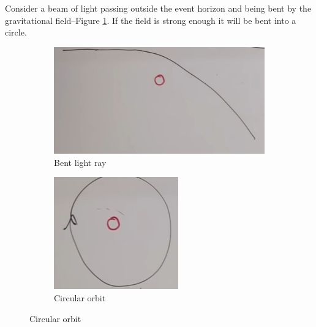 \documentclass[]{article}
\begin{document}
{Consider a beam of light passing outside the event horizon and being bent by the gravitational field--Figure \ref{fig:gr-6-bent-light-ray}. If the field is strong enough it will be bent into a circle.
\begin{figure}[H]
	\caption{Light ray being bent my massive object}
	\begin{subfigure}[t]{0.45\textwidth}
		\caption{Bent light ray}\label{fig:gr-6-bent-light-ray}
		\includegraphics[width=\textwidth]{gr-6-bent-light-ray}
	\end{subfigure}
	\begin{subfigure}[t]{0.45\textwidth}
		\caption{Circular orbit}\label{fig:gr-6-circular-trajectory}
		\includegraphics[width=\textwidth]{gr-6-circular-trajectory}
	\end{subfigure}
\end{figure}

}
\end{document}
